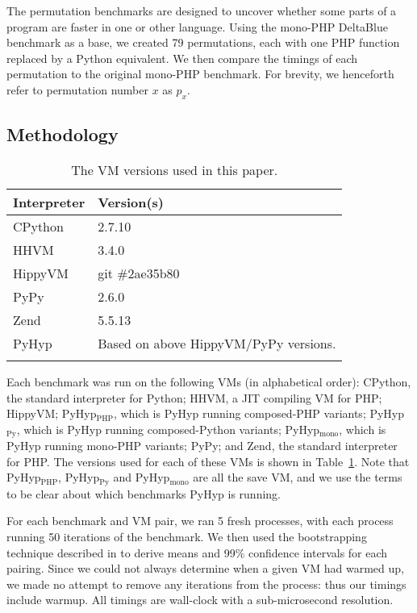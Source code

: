 \documentclass[a4paper,UKenglish]{lipics-v2016}
\newcommand{\ourvm}{PyHyp\xspace}
\newcommand{\hippy}{HippyVM\xspace}
\newcommand{\pypy}{PyPy\xspace}
\newcommand{\ourvmcomp}{PyHyp$_{\textrm{PHP}}$\xspace}
\newcommand{\ourvmcompr}{PyHyp$_{\textrm{Py}}$\xspace}
\newcommand{\ourvmmono}{PyHyp$_{\textrm{mono}}$\xspace}
\begin{document}
The permutation benchmarks are designed to uncover whether some parts of a program are
faster in one or other language. Using the mono-PHP DeltaBlue benchmark as a
base, we created 79 permutations, each with one PHP function replaced by a
Python equivalent. We then
compare the timings of each permutation to the original mono-PHP benchmark. For brevity, we
henceforth refer to permutation number $x$ as $p_x$.


\subsection{Methodology}

\begin{table}[t]
\begin{center}
\begin{tabular}{ll}
\toprule
Interpreter&	Version(s)\\
\midrule
CPython	&2.7.10\\
HHVM		&3.4.0\\
\hippy		&git \#2ae35b80\\
\pypy		&2.6.0\\
Zend		&5.5.13\\
\ourvm		&Based on above \hippy/\pypy versions.\\
\bottomrule
\\
\end{tabular}
\caption{The VM versions used in this paper.}
\label{tab:versions}
\end{center}
\end{table}

Each benchmark was run on the following VMs (in alphabetical order): CPython, the standard
interpreter for Python; HHVM, a JIT compiling VM for PHP; \hippy; \ourvmcomp, which is \ourvm
running composed-PHP variants; \ourvmcompr, which is \ourvm running composed-Python
variants; \ourvmmono, which is \ourvm running mono-PHP
variants; \pypy; and Zend, the standard interpreter for PHP. The versions used
for each of these VMs is shown in Table~\ref{tab:versions}. Note that
\ourvmcomp, \ourvmcompr and \ourvmmono are all the save VM, and we use the
terms to be clear about which benchmarks \ourvm is running.

\label{no warmup chopping}
For each benchmark and VM pair, we ran 5 fresh processes, with each process
running 50 iterations of the benchmark. We then
used the bootstrapping technique described in \cite{kalibera12quantifying} to
derive means and 99\%{} confidence intervals for each pairing. Since we could not always
determine when a given VM had warmed up, we made no attempt to remove any
iterations from the process: thus our timings include warmup. All timings are
wall-clock with a sub-microsecond resolution.
\end{document}
